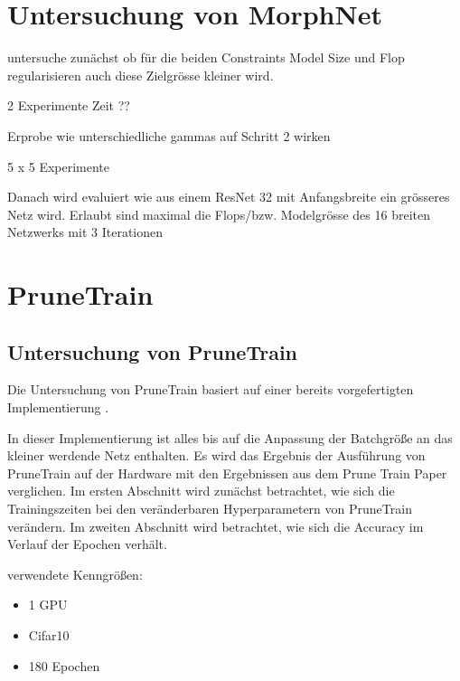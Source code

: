 \chapter{Untersuchung von MorphNet}\label{sec:morphexperimente}

untersuche zunächst ob für die beiden Constraints Model Size und Flop regularisieren auch diese Zielgrösse kleiner wird.

2 Experimente Zeit ??


Erprobe wie unterschiedliche gammas auf Schritt 2 wirken


5 x 5 Experimente 


Danach wird evaluiert wie aus einem ResNet 32 mit Anfangsbreite ein grösseres Netz wird. Erlaubt sind maximal die Flops/bzw. Modelgrösse des 16 breiten Netzwerks mit 3 Iterationen












\chapter{PruneTrain}
\section{Untersuchung von PruneTrain}\label{sec:ptexperimente}
Die Untersuchung von PruneTrain basiert auf einer bereits vorgefertigten Implementierung \cite{ptImpl}. 


In dieser Implementierung ist alles bis auf die Anpassung der Batchgröße an das kleiner werdende Netz enthalten. Es wird das Ergebnis der Ausführung von PruneTrain auf der Hardware mit den Ergebnissen aus dem Prune Train Paper verglichen. Im ersten Abschnitt wird zunächst betrachtet, wie sich die Trainingszeiten bei den veränderbaren Hyperparametern von PruneTrain verändern. Im zweiten Abschnitt wird betrachtet, wie sich die Accuracy im Verlauf der Epochen verhält.




verwendete Kenngrößen:

\begin{itemize}
 \item 1 GPU
 \item Cifar10
 \item 180 Epochen
\end{itemize}

